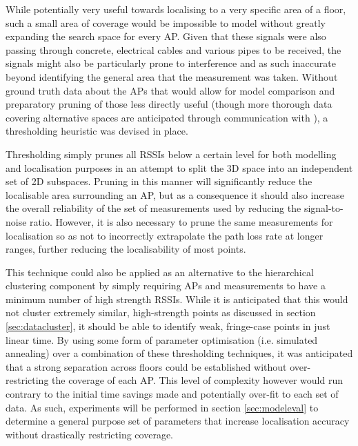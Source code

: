 \documentclass{UoYCSproject}
\begin{document}
                While potentially very useful towards localising to a very specific area of a floor, such a small area of coverage would be impossible to model without greatly expanding the search space for every AP. Given that these signals were also passing through concrete, electrical cables and various pipes to be received, the signals might also be particularly prone to interference and as such inaccurate beyond identifying the general area that the measurement was taken. Without ground truth data about the APs that would allow for model comparison and preparatory pruning of those less directly useful (though more thorough data covering alternative spaces are anticipated through communication with \citet{JoaquinEmail}), a thresholding heuristic was devised in place.
                
                Thresholding simply prunes all RSSIs below a certain level for both modelling and localisation purposes in an attempt to split the 3D space into an independent set of 2D subspaces. Pruning in this manner will significantly reduce the localisable area surrounding an AP, but as a consequence it should also increase the overall reliability of the set of measurements used by reducing the signal-to-noise ratio. However, it is also necessary to prune the same measurements for localisation so as not to incorrectly extrapolate the path loss rate at longer ranges, further reducing the localisability of most points.
                
                This technique could also be applied as an alternative to the hierarchical clustering component by simply requiring APs and measurements to have a minimum number of high strength RSSIs. While it is anticipated that this would not cluster extremely similar, high-strength points as discussed in section \ref{sec:datacluster}, it should be able to identify weak, fringe-case points in just linear time. By using some form of parameter optimisation (i.e. simulated annealing) over a combination of these thresholding techniques, it was anticipated that a strong separation across floors could be established without over-restricting the coverage of each AP. This level of complexity however would run contrary to the initial time savings made and potentially over-fit to each set of data. As such, experiments will be performed in section \ref{sec:modeleval} to determine a general purpose set of parameters that increase localisation accuracy without drastically restricting coverage.
                
\end{document}
